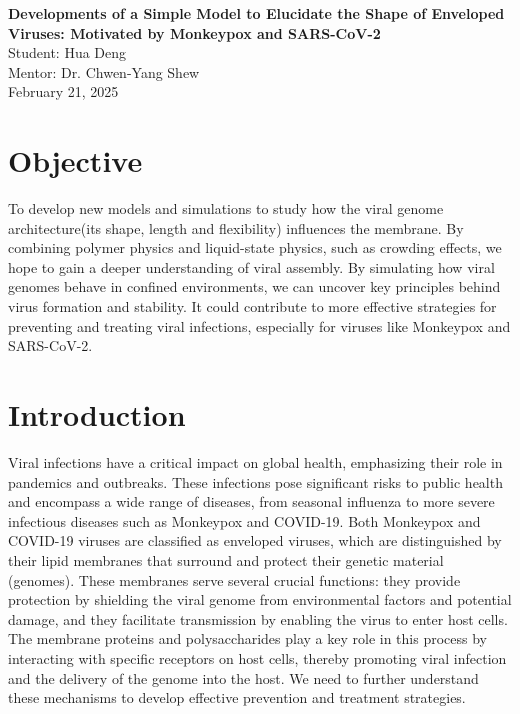 \documentclass[12pt]{article}
\begin{document}
\doublespacing

\begin{center}
{\Large \textbf{Developments of a Simple Model to Elucidate the Shape of Enveloped Viruses: Motivated by Monkeypox and SARS-CoV-2}}\\[1.5ex]
{\normalsize Student: Hua Deng}\\
{\normalsize Mentor: Dr. Chwen-Yang Shew}\\
{\normalsize February 21, 2025}
\end{center}





\begin{flushleft}
\setlength{\parindent}{45pt}

\section*{Objective}




To develop new models and simulations to study how the viral genome architecture(its shape, length and flexibility) influences the membrane. By combining polymer physics and liquid-state physics, such as crowding effects, we hope to gain a deeper understanding of viral assembly. By simulating how viral genomes behave in confined environments, we can uncover key principles behind virus formation and stability. It could contribute to more effective strategies for preventing and treating viral infections, especially for viruses like Monkeypox and SARS-CoV-2.
\section*{Introduction}

Viral infections have a critical impact on global health, emphasizing their role in pandemics and outbreaks. These infections pose significant risks to public health and encompass a wide range of diseases, from seasonal influenza to more severe infectious diseases such as Monkeypox and COVID-19. Both Monkeypox and COVID-19 viruses are classified as enveloped viruses, which are distinguished by their lipid membranes that surround and protect their genetic material (genomes). These membranes serve several crucial functions: they provide protection by shielding the viral genome from environmental factors and potential damage, and they facilitate transmission by enabling the virus to enter host cells. The membrane proteins and polysaccharides play a key role in this process by interacting with specific receptors on host cells, thereby promoting viral infection and the delivery of the genome into the host. We need to further understand these mechanisms to develop effective prevention and treatment strategies.


\end{flushleft}
\end{document}
